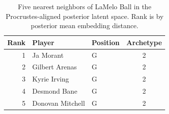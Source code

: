 \begin{table}[htbp]
  \centering\small
  \begin{tabular}{rllc}
    \toprule
    Rank & Player & Position & Archetype \\
    \midrule
    1 & Ja Morant & G & 2 \\
    2 & Gilbert Arenas & G & 2 \\
    3 & Kyrie Irving & G & 2 \\
    4 & Desmond Bane & G & 2 \\
    5 & Donovan Mitchell & G & 2 \\
    \bottomrule
  \end{tabular}
  \caption{Five nearest neighbors of LaMelo Ball in the Procrustes-aligned posterior latent space. Rank is by posterior mean embedding distance.}
\end{table}


